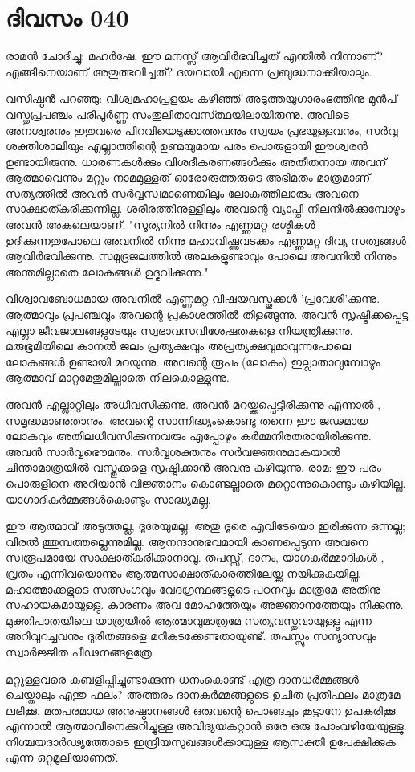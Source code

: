  
\section{ദിവസം 040}


രാമന്‍ ചോദിച്ചു: മഹര്‍ഷേ, ഈ മനസ്സ്‌ ആവിര്‍ഭവിച്ചത്‌ എന്തില്‍ നിന്നാണ്‌? എങ്ങിനെയാണ്‌ അതുത്ഭവിച്ചത്‌? ദയവായി എന്നെ പ്രബുദ്ധനാക്കിയാലും.

വസിഷ്ഠന്‍ പറഞ്ഞു: വിശ്വമഹാപ്രളയം കഴിഞ്ഞ്‌ അടുത്തയുഗാരംഭത്തിനു മുന്‍പ്‌ വസ്തുപ്രപഞ്ചം പരിപൂര്‍ണ്ണ സംതുലിതാവസ്ത്ഥയിലായിരുന്നു. അവിടെ അനശ്വരനും ഇതുവരെ പിറവിയെടുക്കാത്തവനും സ്വയം പ്രഭയുള്ളവനും, സര്‍വ്വ ശക്തിശാലിയും എല്ലാത്തിന്റെ ഉണ്മയുമായ പരം പൊരുളായി ഈശ്വരന്‍ ഉണ്ടായിരുന്നു. ധാരണകള്‍ക്കും വിശദീകരണങ്ങള്‍ക്കും അതീതനായ അവന്‌ ആത്മാവെന്നും മറ്റും നാമമുള്ളത്‌ ഓരോരുത്തരുടെ അഭിമതം മാത്രമാണ്‌. സത്യത്തില്‍ അവന്‍ സര്‍വ്വസ്വമാണെങ്കിലും ലോകത്തിലാരും അവനെ സാക്ഷാത്കരിക്കുന്നില്ല. ശരീരത്തിനുള്ളിലും അവന്റെ വ്യാപ്തി നിലനില്‍ക്കുമ്പോഴും അവന്‍ അകലെയാണ്‌. "സൂര്യനില്‍ നിന്നും എണ്ണമറ്റ രശ്മികള്‍ ഉദിക്കുന്നതുപോലെ അവനില്‍ നിന്നു മഹാവിഷ്ണുവടക്കം എണ്ണമറ്റ ദിവ്യ സത്വങ്ങള്‍ ആവിര്‍ഭവിക്കുന്നു. സമുദ്രജലത്തില്‍ അലകളുണ്ടാവും പോലെ അവനില്‍ നിന്നും അന്തമില്ലാതെ ലോകങ്ങള്‍ ഉദ്ഭവിക്കുന്നു."

വിശ്വാവബോധമായ അവനില്‍ എണ്ണമറ്റ വിഷയവസ്തുക്കള്‍ 'പ്രവേശി'ക്കുന്നു. ആത്മാവും പ്രപഞ്ചവും അവന്റെ പ്രകാശത്തില്‍ തിളങ്ങുന്നു. അവന്‍ സൃഷ്ടിക്കപ്പെട്ട എല്ലാ ജീവജാലങ്ങളുടേയും സ്വഭാവസവിശേഷതകളെ നിയന്ത്രിക്കുന്നു. മരുഭൂമിയിലെ കാനല്‍ ജലം പ്രത്യക്ഷവും അപ്രത്യക്ഷവുമാവുന്നപോലെ ലോകങ്ങള്‍ ഉണ്ടായി മറയുന്നു. അവന്റെ രൂപം (ലോകം) ഇല്ലാതാവുമ്പോഴും ആത്മാവ്‌ മാറ്റമേതുമില്ലാതെ നിലകൊള്ളുന്നു. 

അവന്‍ എല്ലാറ്റിലും അധിവസിക്കുന്നു. അവന്‍ മറയ്ക്കപ്പെട്ടിരിക്കുന്നു എന്നാല്‍ , സമൃദ്ധമാണുതാനും. അവന്റെ സാന്നിദ്ധ്യംകൊണ്ടു തന്നെ ഈ ജഢമായ ലോകവും അതിലധിവസിക്കുന്നവരും എപ്പോഴും കര്‍മ്മനിരതരായിരിക്കുന്നു. അവന്‍ സാര്‍വ്വഭൌമനും, സര്‍വ്വശക്തനും സര്‍വജ്ഞനുമാകയാല്‍ ചിന്താമാത്രയില്‍ വസ്തുക്കളെ സൃഷ്ടിക്കാന്‍ അവനു കഴിയുന്നു. രാമ: ഈ പരം പൊരുളിനെ അറിയാന്‍ വിജ്ഞാനം കൊണ്ടല്ലാതെ മറ്റൊന്നുകൊണ്ടും കഴിയില്ല. യാഗാദികര്‍മ്മങ്ങള്‍കൊണ്ടും സാദ്ധ്യമല്ല.

ഈ  ആത്മാവ്‌  അടുത്തല്ല, ദൂരേയുമല്ല. അതു ദൂരെ എവിടേയൊ ഇരിക്കുന്ന ഒന്നല്ല; വിരല്‍ ത്തുമ്പത്തല്ലെന്നുമില്ല. ആനന്ദാനുഭവമായി കാണപ്പെടുന്ന അവനെ സ്വരൂപമായേ സാക്ഷാത്കരിക്കാനാവൂ. തപസ്സ്‌, ദാനം, യാഗകര്‍മ്മാദികള്‍ , വ്രതം എന്നിവയൊന്നും ആത്മസാക്ഷാത്കാരത്തിലേയ്ക്കു നയിക്കുകയില്ല. മഹാത്മാക്കളുടെ സത്സംഗവും വേദഗ്രന്ഥങ്ങളുടെ പഠനവും മാത്രമേ അതിനു സഹായകമായുള്ളു. കാരണം അവ മോഹത്തേയും അജ്ഞാനത്തേയും നീക്കുന്നു. മുക്തിപാതയിലെ യാത്രയില്‍ ആത്മാവുമാത്രമേ സത്യവസ്തുവായുള്ളൂ എന്ന അറിവുറച്ചവനും ദുരിതങ്ങളെ മറികടക്കേണ്ടതായുണ്ട്‌. തപസ്സും സന്യാസവും സ്വാര്‍ജ്ജിത പീഢനങ്ങളത്രേ.

മറ്റുള്ളവരെ കബളിപ്പിച്ചുണ്ടാക്കുന്ന ധനംകൊണ്ട്‌ എത്ര ദാനധര്‍മ്മങ്ങള്‍ ചെയ്താലും എന്തു ഫലം? അത്തരം ദാനകര്‍മ്മങ്ങളുടെ ഉചിത  പ്രതിഫലം മാത്രമേ ലഭിക്കൂ. മതപരമായ അനുഷ്ഠാനങ്ങള്‍ ഒരുവന്റെ പൊങ്ങച്ചം കൂട്ടാനേ ഉപകരിക്കൂ. എന്നാല്‍  ആത്മാവിനെക്കുറിച്ചുള്ള അവിദ്യയകറ്റാന്‍ ഒരേ ഒരു പോംവഴിയേയുള്ളു. നിശ്ചയദാര്‍ഢ്യത്തോടെ ഇന്ദ്രിയസുഖങ്ങള്‍ക്കായുള്ള ആസക്തി ഉപേക്ഷിക്കുക എന്ന ഒറ്റമൂലിയാണത്‌.
